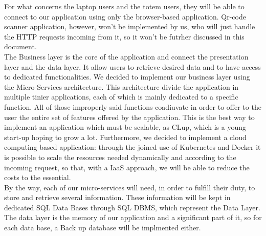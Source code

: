 For what concerns the laptop users and the totem users, they will be able to connect to our application using only the browser-based application.
Qr-code scanner application, however, won't be implemented by us, who will just handle the HTTP requests incoming from it, so it won't be futrher discussed in this document.\\
The Business layer is the core of the application and connect the presentation layer and the data layer. It allow users to retrieve desired data and to have access to dedicated functionalities. We decided to implement our business layer using the Micro-Services architecture. This architecture divide the application in multiple tinier applications, each of which is mainly dedicated to a specific function. All of those improperly said functions coadiuvate in order to offer to the user the entire set of features offered by the application. This is the best way to implement an application which must be scalable, as CLup, which is a young start-up hoping to grow a lot. Furthermore, we decided to implement a cloud computing based application: through the joined use of Kubernetes and Docker it is possible to scale the resources needed dynamically and according to the incoming request, so that, with a IaaS approach, we will be able to reduce the costs to the essential.\\
By the way, each of our micro-services will need, in order to fulfill their duty, to store and retrieve several information. These information will be kept in dedicated SQL Data Bases through SQL DBMS, which represent the Data Layer. The data layer is the memory of our application and a significant part of it, so for each data base, a Back up database will be implmented either.\\


